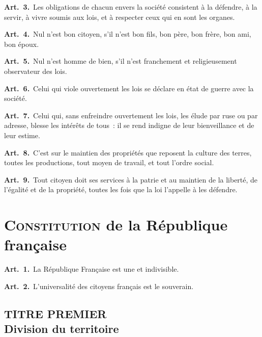 \documentclass[french,twoside]{book} %
\newcommand{\labelchar}[1]{\textbf{\color{rubric} #1}}
\newcommand\chapteropen{} %
\newcommand\chaptercont{} %
\newcommand\chapterclose{} %
\begin{document}
\labelchar{Art. 3.} Les obligations de chacun envers la société consistent à la défendre, à la servir, à vivre soumis aux lois, et à respecter ceux qui en sont les organes.\par
\labelchar{Art. 4.} Nul n’est bon citoyen, s’il n’est bon fils, bon père, bon frère, bon ami, bon époux.\par
\labelchar{Art. 5.} Nul n’est homme de bien, s’il n’est franchement et religieusement observateur des lois.\par
\labelchar{Art. 6.} Celui qui viole ouvertement les lois se déclare en état de guerre avec la société.\par
\labelchar{Art. 7.} Celui qui, sans enfreindre ouvertement les lois, les élude par ruse ou par adresse, blesse les intérêts de tous : il se rend indigne de leur bienveillance et de leur estime.\par
\labelchar{Art. 8.} C’est sur le maintien des propriétés que reposent la culture des terres, toutes les productions, tout moyen de travail, et tout l’ordre social.\par
\labelchar{Art. 9.} Tout citoyen doit ses services à la patrie et au maintien de la liberté, de l’égalité et de la propriété, toutes les fois que la loi l’appelle à les défendre.
\chapterclose


\chapteropen

\chapter[{Constitution de la République française}]{{\scshape Constitution} de la République française}
\renewcommand{\leftmark}{{\scshape Constitution} de la République française}


\chaptercont
\labelchar{Art. 1.} La République Française est une et indivisible.\par
\labelchar{Art. 2.} L’universalité des citoyens français est le souverain.\par

\section[{TITRE PREMIER. Division du territoire}]{TITRE PREMIER \\
Division du territoire}
\end{document}
